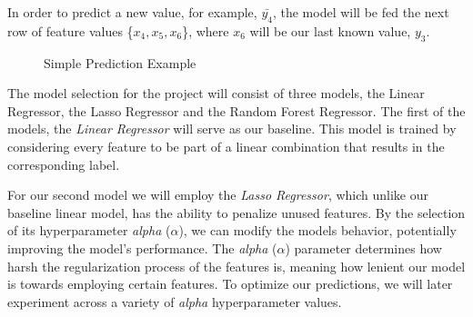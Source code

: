 \documentclass[12pt]{report} %
\begin{document}
In order to predict a new value, for example, $\bar{y_4}$, the model will be fed the next row of feature values \{$x_4, x_5, x_6$\}, where $x_6$ will be our last known value, $y_3$.

\begin{figure}[H]
    \centering
    \caption{Simple Prediction Example}
    \label{fig:pred_example}
\end{figure}


The model selection for the project will consist of three models, the Linear Regressor, the Lasso Regressor and the Random Forest Regressor. The first of the models, the \textit{Linear Regressor} will serve as our baseline. This model is trained by considering every feature to be part of a linear combination that results in the corresponding label.


For our second model we will employ the \textit{Lasso Regressor}, which unlike our baseline linear model, has the ability to penalize unused features. By the selection of its hyperparameter \textit{alpha} ($\alpha$), we can modify the models behavior, potentially improving the model's performance. The \textit{alpha} ($\alpha$) parameter determines how harsh the regularization process of the features is, meaning how lenient our model is towards employing certain features. To optimize our predictions, we will later experiment across a variety of \textit{alpha} hyperparameter values.
\end{document}

